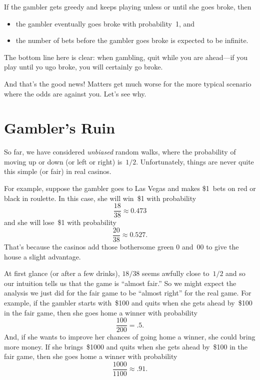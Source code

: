 If the gambler gets greedy and keeps playing unless or until she goes
broke, then
\begin{itemize}

\item

the gambler eventually goes broke with probability~1, and

\item
the number of bets before the gambler goes broke is expected to be
infinite.

\end{itemize}

The bottom line here is clear: when gambling, quit while you are
ahead---if you play until yo ugo broke, you will certainly go broke.

And that's the good news!  Matters get much worse for the more typical
scenario where the odds are against you.  Let's see why.

\section{Gambler's Ruin}

So far, we have considered \emph{unbiased} random walks, where the
probability of moving up or down (or left or right) is~$1/2$.
Unfortunately, things are never quite this simple (or fair) in real
casinos.

For example, suppose the gambler goes to Las Vegas and makes \$1~bets
on red or black in roulette.  In this case, she will win~\$1 with
probability
\begin{equation*}
    \frac{18}{38} \approx 0.473
\end{equation*}
and she will lose~\$1 with probability
\begin{equation*}
    \frac{20}{38} \approx 0.527.
\end{equation*}
That's because the casinos add those bothersome green 0 and~00 to give
the house a slight advantage.

At first glance (or after a few drinks), $18/38$ seems awfully close
to~$1/2$ and so our intuition tells us that the game is ``almost
fair.''  So we might expect the analysis we just did for the fair game
to be ``almost right'' for the real game.  For example, if the gambler
starts with~\$100 and quits when she gets ahead by~\$100 in the fair
game, then she goes home a winner with probability
\begin{equation*}
    \frac{100}{200} = .5.
\end{equation*}
And, if she wants to improve her chances of going home a winner, she
could bring more money.  If she brings~\$1000 and quits when she gets
ahead by~\$100 in the fair game, then she goes home a winner with
probability
\begin{equation*}
    \frac{1000}{1100} \approx .91.
\end{equation*}

